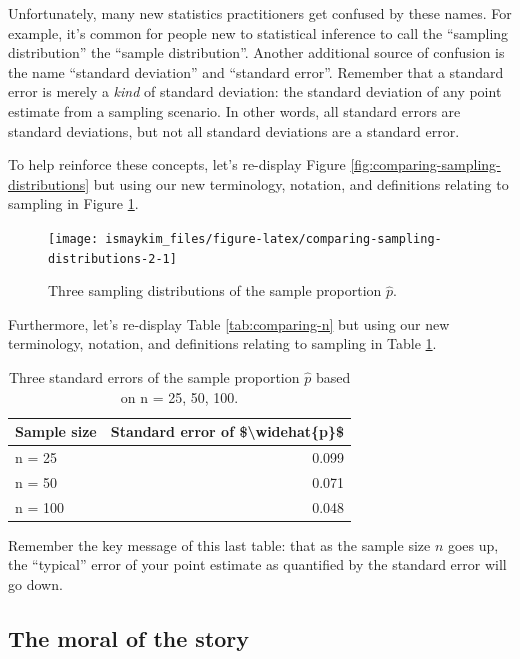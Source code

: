 \documentclass[12pt, krantz2,]{krantz}
\begin{document}
Unfortunately, many new statistics practitioners get confused by these names. For example, it's common for people new to statistical inference to call the ``sampling distribution'' the ``sample distribution''. Another additional source of confusion is the name ``standard deviation'' and ``standard error''. Remember that a standard error is merely a \emph{kind} of standard deviation: the standard deviation of any point estimate from a sampling scenario. In other words, all standard errors are standard deviations, but not all standard deviations are a standard error.

To help reinforce these concepts, let's re-display Figure \ref{fig:comparing-sampling-distributions} but using our new terminology, notation, and definitions relating to sampling in Figure \ref{fig:comparing-sampling-distributions-2}.

\begin{figure}

{\centering \texttt{[image: ismaykim\_files/figure-latex/comparing-sampling-distributions-2-1]} 

}

\caption{Three sampling distributions of the sample proportion $\widehat{p}$.}\label{fig:comparing-sampling-distributions-2}
\end{figure}

Furthermore, let's re-display Table \ref{tab:comparing-n} but using our new terminology, notation, and definitions relating to sampling in Table \ref{tab:comparing-n-2}.

\begin{table}[H]

\caption{\label{tab:comparing-n-2}Three standard errors of the sample proportion $\widehat{p}$ based on n = 25, 50, 100. }
\centering
\fontsize{10}{12}\selectfont
\begin{tabular}{lr}
\toprule
Sample size & Standard error of \$\textbackslash{}widehat\{p\}\$\\
\midrule
n = 25 & 0.099\\
n = 50 & 0.071\\
n = 100 & 0.048\\
\bottomrule
\end{tabular}
\end{table}

Remember the key message of this last table: that as the sample size \(n\) goes up, the ``typical'' error of your point estimate as quantified by the standard error will go down.

\hypertarget{the-moral-of-the-story}{%
\subsection{The moral of the story}\label{the-moral-of-the-story}}
\end{document}

